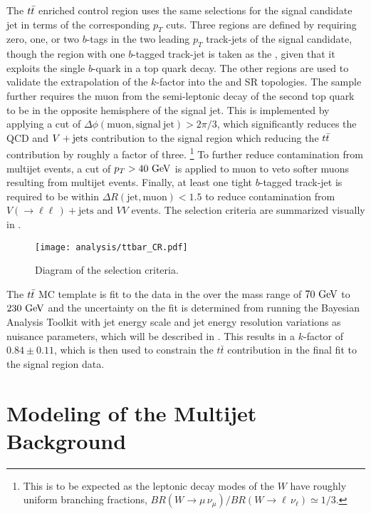 The $t\bar{t}$ enriched control region uses the same selections for the signal candidate \largeR{} jet in terms of the corresponding $p_{T}$ cuts.
Three regions are defined by requiring zero, one, or two $b$-tags in the two leading $p_{T}$ track-jets of the signal candidate, though the region with one $b$-tagged track-jet is taken as the \CRttbar{}, given that it exploits the single $b$-quark in a top quark decay.
The other regions are used to validate the extrapolation of the $k$-factor into the \CRQCD{} and SR topologies.
The sample further requires the muon from the semi-leptonic decay of the second top quark to be in the opposite hemisphere of the signal jet.
This is implemented by applying a cut of $\Delta \phi \left(\mathrm{muon}, \mathrm{signal~jet}\right) > 2\pi/3$, which significantly reduces the QCD and $V + \text{jets}$ contribution to the signal region which reducing the $t\bar{t}$ contribution by roughly a factor of three.%
\footnote{This is to be expected as the leptonic decay modes of the $W$ have roughly uniform branching fractions, $BR\left(W \to \mu\, \nu_{\mu}\right)/BR\left(W \to \ell \,\nu_{\ell}\right) \simeq 1/3$.}
To further reduce contamination from multijet events, a cut of $p_{T} > 40~\mathrm{GeV}$ is applied to muon to veto softer muons resulting from multijet events.
Finally, at least one tight $b$-tagged track-jet is required to be within $\Delta R \left(\mathrm{jet}, \mathrm{muon}\right) < 1.5$ to reduce contamination from $V\left(\to \ell\ell\,\right)+\mathrm{jets}$ and $VV$ events.
The \CRttbar{} selection criteria are summarized visually in .

\begin{figure}[htbp]
 \centering
 \texttt{[image: analysis/ttbar\_CR.pdf]}
 \caption[Diagram of the $t\bar{t}$ control region selection criteria.]{%
  Diagram of the \CRttbar{} selection criteria.}
 \label{fig:ttbar_CR_selection}
\end{figure}

The $t\bar{t}$ MC template is fit to the data in the \CRttbar{} over the mass range of $70~\mathrm{GeV}$ to $230~\mathrm{GeV}$ and the uncertainty on the fit is determined from running the Bayesian Analysis Toolkit with \largeR{} jet energy scale and jet energy resolution variations as nuisance parameters, which will be described in .
This results in a $k$-factor of $0.84 \pm 0.11$, which is then used to constrain the $t\bar{t}$ contribution in the final fit to the signal region data.


\section{Modeling of the Multijet Background}\label{sec:multijet_background_modeling}

